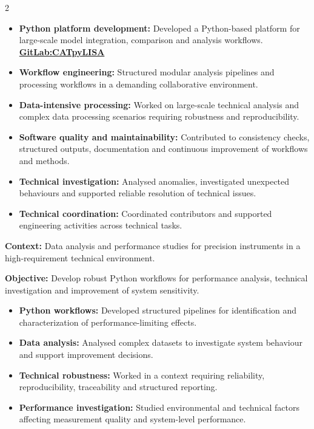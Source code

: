 \documentclass[8pt,a4paper,ragged2e,withhyper]{altacv}
\begin{document}
\begin{paracol}{2}
\begin{itemize}
\item \textbf{Python platform development:} Developed a Python-based platform for large-scale model integration, comparison and analysis workflows. \textcolor{DarkPastelRed}{\href{https://gitlab.oca.eu/gboileau/lisa_l3_tools}{\bf GitLab:CATpyLISA}}
\item \textbf{Workflow engineering:} Structured modular analysis pipelines and processing workflows in a demanding collaborative environment.
\item \textbf{Data-intensive processing:} Worked on large-scale technical analysis and complex data processing scenarios requiring robustness and reproducibility.
\item \textbf{Software quality and maintainability:} Contributed to consistency checks, structured outputs, documentation and continuous improvement of workflows and methods.
\item \textbf{Technical investigation:} Analysed anomalies, investigated unexpected behaviours and supported reliable resolution of technical issues.
\item \textbf{Technical coordination:} Coordinated contributors and supported engineering activities across technical tasks.
\end{itemize}
\divider


\textbf{Context:} Data analysis and performance studies for precision instruments in a high-requirement technical environment.

\textbf{Objective:} Develop robust Python workflows for performance analysis, technical investigation and improvement of system sensitivity.

\begin{itemize}
\item \textbf{Python workflows:} Developed structured pipelines for identification and characterization of performance-limiting effects.
\item \textbf{Data analysis:} Analysed complex datasets to investigate system behaviour and support improvement decisions.
\item \textbf{Technical robustness:} Worked in a context requiring reliability, reproducibility, traceability and structured reporting.
\item \textbf{Performance investigation:} Studied environmental and technical factors affecting measurement quality and system-level performance.
\end{itemize}
\divider


\end{paracol}
\end{document}
